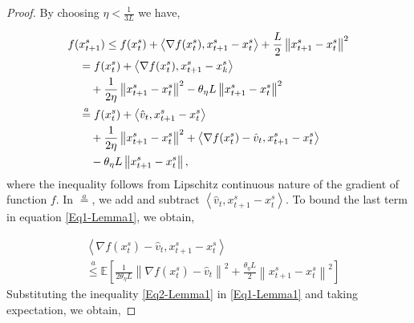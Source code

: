 \documentclass{article}
\newcommand*{\E}{\mathbb{E}}
\newcommand{\norm}[1]{\left\lVert#1\right\rVert}
\newcommand{\Iprod}[2]{\left\langle #1,#2\right\rangle}
\theoremstyle{definition}
\theoremstyle{remark}
\begin{document}
{
\begin{proof}
By choosing $\eta < \frac{1}{3L}$ we have,

\begin{gather}
\label{Eq1-Lemma1}
\begin{split}
f(&x_{t+1}^s)  \leq f(x_{t}^s) + \Iprod{\nabla f(x_{t}^s)}{x_{t+1}^s-x_{t}^s}+\frac{L}{2}\norm{x_{t+1}^s-x_{t}^s}^2\\
&=f(x_{t}^s) + \Iprod{\nabla f(x_{t}^s)}{x_{t+1}^s-x_{k}^s}\\
&~~~+ {\frac{1 }{2\eta}}\norm{x_{t+1}^s-x_{t}^s}^2-{\theta_{\eta} L}\norm{x_{t+1}^s-x_{t}^s}^2\\
&\stackrel{a}{=}f(x_{t}^s) + \Iprod{\hat{v}_{t}}{x_{t+1}^s-x_{t}^s}\\
&~~~+ { \frac{1}{2\eta}}\norm{x_{t+1}^s-x_{t}^s}^2+\Iprod{\nabla f(x_{t}^s)-\hat{v}_{t}}{x_{t+1}^s-x_{t}^s}\\
&~~~-{\theta_{\eta} L}\norm{x_{t+1}^s-x_{t}^s},
\end{split}
\raisetag{15pt}
\end{gather}
where the inequality follows from Lipschitz continuous nature of the gradient of function $f$. In $\stackrel{a}{=}$, we add and subtract $\Iprod{\hat{v}_{t}}{x_{t+1}^s-x_{t}^s}$. 
To bound the last term in equation \eqref{Eq1-Lemma1}, we obtain,

\begin{equation}\label{Eq2-Lemma1}
\begin{split}
&\Iprod{\nabla f(x_{t}^s)-\hat{v}_{t}}{x_{t+1}^s-x_{t}^s}\\
&\stackrel{a}{\leq} \E\left[\frac{1}{2\theta_{\eta} L}\norm{\nabla f(x_{t}^s)-\hat{v}_{t}}^2 + \frac{\theta_{\eta} L}{2}\norm{x_{t+1}^s-x_{t}^s}^2\right]
\end{split}
\end{equation}
Substituting the inequality \eqref{Eq2-Lemma1} in \eqref{Eq1-Lemma1} and taking expectation, we obtain,


\end{proof}}
\end{document}
